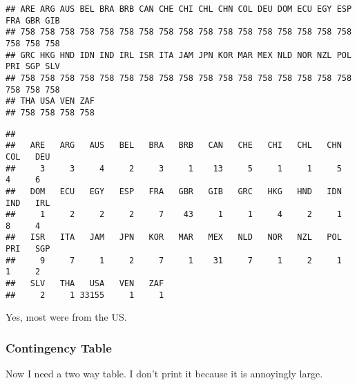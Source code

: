 \documentclass[
]{article}
\newenvironment{Shaded}{\begin{snugshade}}{\end{snugshade}}
\newcommand{\FunctionTok}[1]{\textcolor[rgb]{0.13,0.29,0.53}{\textbf{#1}}}
\newcommand{\NormalTok}[1]{#1}
\newcommand{\SpecialCharTok}[1]{\textcolor[rgb]{0.81,0.36,0.00}{\textbf{#1}}}
\newcommand{\StringTok}[1]{\textcolor[rgb]{0.31,0.60,0.02}{#1}}
\begin{document}
\begin{verbatim}
## ARE ARG AUS BEL BRA BRB CAN CHE CHI CHL CHN COL DEU DOM ECU EGY ESP FRA GBR GIB 
## 758 758 758 758 758 758 758 758 758 758 758 758 758 758 758 758 758 758 758 758 
## GRC HKG HND IDN IND IRL ISR ITA JAM JPN KOR MAR MEX NLD NOR NZL POL PRI SGP SLV 
## 758 758 758 758 758 758 758 758 758 758 758 758 758 758 758 758 758 758 758 758 
## THA USA VEN ZAF 
## 758 758 758 758
\end{verbatim}

\begin{Shaded}
\end{Shaded}

\begin{verbatim}
## 
##   ARE   ARG   AUS   BEL   BRA   BRB   CAN   CHE   CHI   CHL   CHN   COL   DEU 
##     3     3     4     2     3     1    13     5     1     1     5     4     6 
##   DOM   ECU   EGY   ESP   FRA   GBR   GIB   GRC   HKG   HND   IDN   IND   IRL 
##     1     2     2     2     7    43     1     1     4     2     1     8     4 
##   ISR   ITA   JAM   JPN   KOR   MAR   MEX   NLD   NOR   NZL   POL   PRI   SGP 
##     9     7     1     2     7     1    31     7     1     2     1     1     2 
##   SLV   THA   USA   VEN   ZAF 
##     2     1 33155     1     1
\end{verbatim}

Yes, most were from the US.

\subsubsection{Contingency Table}\label{contingency-table}

Now I need a two way table. I don't print it because it is annoyingly
large.

\begin{Shaded}
\end{Shaded}
\end{document}
